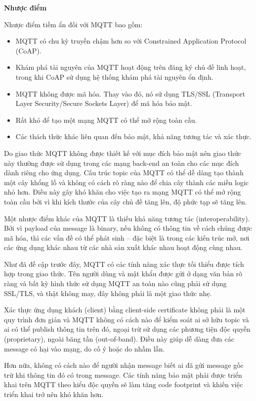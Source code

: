 \textbf{Nhược điểm}

Nhược điểm tiềm ẩn đối với MQTT bao gồm:
\begin{itemize}
    \item MQTT có chu kỳ truyền chậm hơn so với Constrained Application Protocol (CoAP).
    \item Khám phá tài nguyên của MQTT hoạt động trên đăng ký chủ đề linh hoạt, trong khi CoAP sử dụng hệ thống khám phá tài nguyên ổn định.
    \item MQTT không được mã hóa. Thay vào đó, nó sử dụng TLS/SSL (Transport Layer Security/Secure Sockets Layer) để mã hóa bảo mật.
    \item Rất khó để tạo một mạng MQTT có thể mở rộng toàn cầu.
    \item Các thách thức khác liên quan đến bảo mật, khả năng tương tác và xác thực.
\end{itemize}

Do giao thức MQTT không được thiết kế với mục đích bảo mật nên giao thức này thường được sử dụng trong các mạng back-end an toàn cho các mục đích dành riêng cho ứng dụng. Cấu trúc topic của MQTT có thể dễ dàng tạo thành một cây khổng lồ và không có cách rõ ràng nào để chia cây thành các miền logic nhỏ hơn. Điều này gây khó khăn cho việc tạo ra mạng MQTT có thể mở rộng toàn cầu bởi vì khi kích thước của cây chủ đề tăng lên, độ phức tạp sẽ tăng lên.

Một nhược điểm khác của MQTT là thiếu khả năng tương tác (interoperability). Bởi vì payload của message là binary, nếu không có thông tin về cách chúng được mã hóa, thì các vấn đề có thể phát sinh -- đặc biệt là trong các kiến trúc mở, nơi các ứng dụng khác nhau từ các nhà sản xuất khác nhau hoạt động cùng nhau.

Như đã đề cập trước đây, MQTT có các tính năng xác thực tối thiểu được tích hợp trong giao thức. Tên người dùng và mật khẩu được gửi ở dạng văn bản rõ ràng và bất kỳ hình thức sử dụng MQTT an toàn nào cũng phải sử dụng SSL/TLS, và thật không may, đây không phải là một giao thức nhẹ.

Xác thực ứng dụng khách (client) bằng client-side certificate không phải là một quy trình đơn giản và MQTT không có cách nào để kiểm soát ai sở hữu topic và ai có thể publish thông tin trên đó, ngoại trừ sử dụng các phương tiện độc quyền (proprietary), ngoài băng tần (out-of-band). Điều này giúp dễ dàng đưa các message có hại vào mạng, do cố ý hoặc do nhầm lẫn.

Hơn nữa, không có cách nào để người nhận message biết ai đã gửi message gốc trừ khi thông tin đó có trong message. Các tính năng bảo mật phải được triển khai trên MQTT theo kiểu độc quyền sẽ làm tăng code footprint và khiến việc triển khai trở nên khó khăn hơn.

